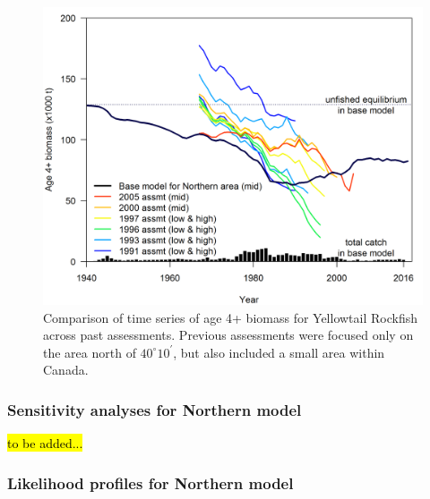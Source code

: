 \documentclass[12pt,]{article}
\begin{document}
\FloatBarrier

\begin{figure}[htbp]
\centering
\includegraphics{Figures/historical_assessment_timeseries.png}
\caption{Comparison of time series of age 4+ biomass for Yellowtail
Rockfish across past assessments. Previous assessments were focused only
on the area north of \(40^\circ 10^\prime\), but also included a small
area within Canada. \label{fig:assessment_history}}
\end{figure}

\FloatBarrier

\newpage

\subsubsection{Sensitivity analyses for Northern
model}\label{sensitivity-analyses-for-northern-model}

\hl{to be added...}

\subsubsection{Likelihood profiles for Northern
model}\label{likelihood-profiles-for-northern-model}
\end{document}
